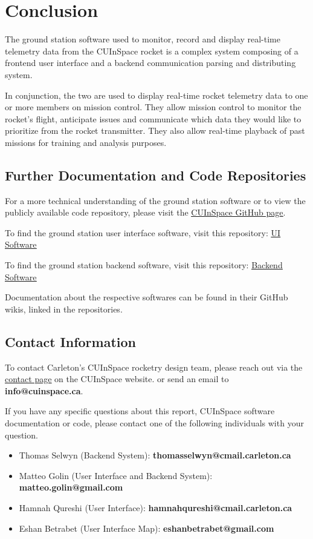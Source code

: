 \sectionfont{\fontsize{14}{14}\selectfont}
\section{Conclusion}

The ground station software used to monitor, record and display real-time telemetry data from the CUInSpace rocket is a
complex system composing of a frontend user interface and a backend communication parsing and distributing system.

In conjunction, the two are used to display real-time rocket telemetry data to one or more members on mission control. They allow
mission control to monitor the rocket's flight, anticipate issues and communicate which data they would like to prioritize from 
the rocket transmitter. They also allow real-time playback of past missions for training and analysis purposes.

\subsection*{Further Documentation and Code Repositories}
For a more technical understanding of the ground station software or to view the publicly available code repository,
please visit the \href{https://github.com/CarletonURocketry}{\underline{CUInSpace GitHub page}}.

To find the ground station user interface software, visit this repository:
\href{https://github.com/CarletonURocketry/ground-station-ui}{\underline{UI Software}} 

To find the ground station backend software, visit this repository:
\href{https://github.com/CarletonURocketry/ground-station}{\underline{Backend Software}}

Documentation about the respective softwares can be found in their GitHub wikis, linked in the repositories.

\subsection*{Contact Information}

To contact Carleton's CUInSpace rocketry design team, please reach out via the \href{https://www.cuinspace.ca/contact-us}
{\underline{contact page}} on the CUInSpace website. or send an email to \textbf{info@cuinspace.ca}.

If you have any specific questions about this report, CUInSpace software documentation or code, please contact one of the 
following individuals with your question.

\begin{itemize}
    \item Thomas Selwyn (Backend System): \textbf{thomasselwyn@cmail.carleton.ca}
    \item Matteo Golin (User Interface and Backend System): \textbf{matteo.golin@gmail.com}
    \item Hamnah Qureshi (User Interface): \textbf{hamnahqureshi@cmail.carleton.ca}
    \item Eshan Betrabet (User Interface Map): \textbf{eshanbetrabet@gmail.com}
\end{itemize}
